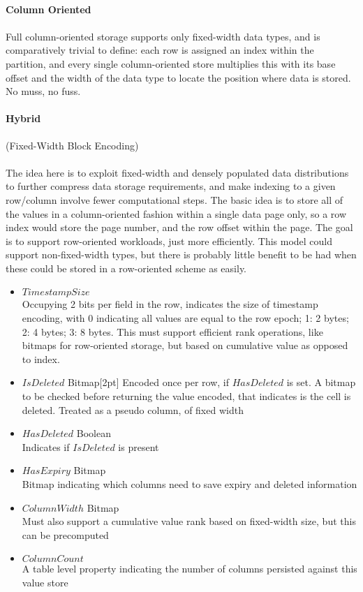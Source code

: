 \documentclass[fleqn]{article}
\begin{document}
\clearpage
\paragraph{Column Oriented}
\paragraph{}
Full column-oriented storage supports only fixed-width data types, and is comparatively trivial to define:
each row is assigned an index within the partition, and every single column-oriented store multiplies this
with its base offset and the width of the data type to locate the position where data is stored. No muss, no fuss.
\paragraph{Hybrid}\normalsize{(Fixed-Width Block Encoding)}
\paragraph{}
The idea here is to exploit fixed-width and densely populated data distributions to further compress
data storage requirements, and make indexing to a given row/column involve fewer computational steps.
The basic idea is to store all of the values in a column-oriented fashion within a single data page only,
so a row index would store the page number, and the row offset within the page. The goal is to support
row-oriented workloads, just more efficiently. This model could support non-fixed-width types, but there
is probably little benefit to be had when these could be stored in a row-oriented scheme as easily.
 \begin{itemize}
\scriptsize
  \item $TimestampSize$\\[2pt]
    Occupying 2 bits per field in the row, indicates the size of timestamp encoding, with 0 indicating
    all values are equal to the row epoch; 1: 2 bytes; 2: 4 bytes; 3: 8 bytes.
    This must support efficient rank operations, like bitmaps for row-oriented storage, but based on
    cumulative value as opposed to index.
  \item $IsDeleted$ Bitmap[2pt]
    Encoded once per row, if $HasDeleted$ is set. A bitmap to be checked before returning the value
    encoded, that indicates is the cell is deleted. Treated as a pseudo column, of fixed width
  \item $HasDeleted$ Boolean\\[2pt]
    Indicates if $IsDeleted$ is present
  \item $HasExpiry$ Bitmap\\[2pt]
    Bitmap indicating which columns need to save expiry and deleted information
  \item $ColumnWidth$ Bitmap\\[2pt]
    Must also support a cumulative value rank based on fixed-width size, but this can be precomputed
  \item $ColumnCount$\\[2pt]
    A table level property indicating the number of columns persisted against this value store
\end{itemize}
\end{document}
